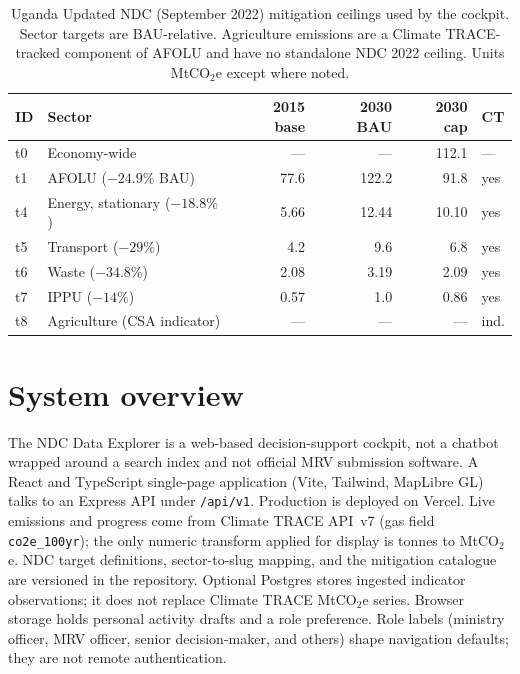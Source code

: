 \documentclass{article}
\begin{document}
\begin{table}[t]
  \caption{Uganda Updated NDC (September 2022) mitigation ceilings used by the cockpit. Sector targets are BAU-relative. Agriculture emissions are a Climate TRACE-tracked component of AFOLU and have no standalone NDC 2022 ceiling. Units MtCO$_2$e except where noted.}
  \label{tab:ndc-targets}
  \centering
  \small
  \begin{tabular}{llrrrl}
    \toprule
    ID & Sector & 2015 base & 2030 BAU & 2030 cap & CT \\
    \midrule
    t0 & Economy-wide & --- & --- & 112.1 & --- \\
    t1 & AFOLU ($-24.9\%$ BAU) & 77.6 & 122.2 & 91.8 & yes \\
    t4 & Energy, stationary ($-18.8\%$) & 5.66 & 12.44 & 10.10 & yes \\
    t5 & Transport ($-29\%$) & 4.2 & 9.6 & 6.8 & yes \\
    t6 & Waste ($-34.8\%$) & 2.08 & 3.19 & 2.09 & yes \\
    t7 & IPPU ($-14\%$) & 0.57 & 1.0 & 0.86 & yes \\
    t8 & Agriculture (CSA indicator) & --- & --- & --- & ind. \\
    \bottomrule
  \end{tabular}
\end{table}

\section{System overview}
\label{sec:system}

The NDC Data Explorer is a web-based decision-support cockpit, not a chatbot wrapped around a search index and not official MRV submission software. A React and TypeScript single-page application (Vite, Tailwind, MapLibre GL) talks to an Express API under \texttt{/api/v1}. Production is deployed on Vercel. Live emissions and progress come from Climate TRACE API~v7 (gas field \texttt{co2e\_100yr}); the only numeric transform applied for display is tonnes to MtCO$_2$e. NDC target definitions, sector-to-slug mapping, and the mitigation catalogue are versioned in the repository. Optional Postgres stores ingested indicator observations; it does not replace Climate TRACE MtCO$_2$e series. Browser storage holds personal activity drafts and a role preference. Role labels (ministry officer, MRV officer, senior decision-maker, and others) shape navigation defaults; they are not remote authentication.
\end{document}

